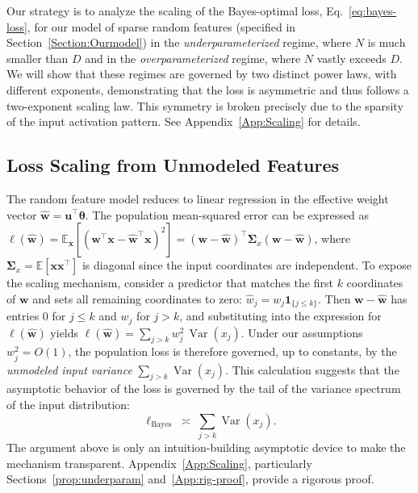\documentclass[11pt]{article}
\theoremstyle{plain}
\theoremstyle{definition}
\theoremstyle{remark}
\newcommand{\JSCheck}[1]{#1}
\begin{document}
Our strategy is to analyze the scaling of the Bayes-optimal loss,  Eq.~\eqref{eq:bayes-loss}, for our model of sparse random features (specified in Section~\ref{Section:Ourmodel}) in the
\emph{underparameterized} regime, where $N$
is much smaller than $D$ and in
the \emph{overparameterized} regime, where \(N\) vastly exceeds \(D\). We will show
that these regimes are governed by two distinct power laws, with different
exponents, demonstrating that the loss is asymmetric and thus follows a two-exponent scaling law. This symmetry is broken precisely due to the sparsity of the input activation pattern.  See Appendix~\ref{App:Scaling} for details. 

\subsection{Loss Scaling from Unmodeled Features}


The random feature model reduces to linear regression in the effective weight vector \(\hat{\mathbf{w}} = \mathbf{u}^\top \boldsymbol{\theta}\). The population mean-squared error can be expressed as $\ell(\hat{\mathbf{w}}) = \mathbb{E}_{\mathbf{x}}\!\left[(\mathbf{w}^\top\mathbf{x} - \hat{\mathbf{w}}^\top\mathbf{x})^2\right]
= (\mathbf{w}-\hat{\mathbf{w}})^\top \boldsymbol{\Sigma}_x (\mathbf{w}-\hat{\mathbf{w}})$, where \(\boldsymbol{\Sigma}_x = \mathbb{E}[\mathbf{x}\mathbf{x}^\top]\) is diagonal
since the input coordinates are independent. \JSCheck{To expose the scaling mechanism, consider a predictor that matches the first \(k\) coordinates of \(\mathbf{w}\) and sets all remaining coordinates to zero: $\hat{w}_j = w_j \mathbf{1}_{\{j \le k\}}$}. Then \(\mathbf{w}-\hat{\mathbf{w}}\) has entries \(0\) for \(j \le k\) and \(w_j\)
for \(j>k\), and substituting into the expression for \(\ell(\hat{\mathbf{w}})\) yields
\(\ell(\hat{\mathbf{w}})
= \sum_{j>k} w_j^2\, \operatorname{Var}(x_j)\). Under our assumptions \(w_j^2 = O(1)\), the population loss is therefore governed, up to constants, by the \emph{unmodeled input variance} $\sum_{j>k} \operatorname{Var}(x_j)$. \JSCheck{This calculation suggests  that the asymptotic behavior of the loss is governed by the tail of the variance spectrum of the input distribution:}
\begin{equation}
\ell_{\mathrm{Bayes}} \;\asymp\; \sum_{j>k} \operatorname{Var}(x_j).
\label{eq:bayes-tail}
\end{equation}
\JSCheck{The argument above is only an intuition-building asymptotic device to make the mechanism transparent. Appendix~\ref{App:Scaling}, particularly Sections~\ref{prop:underparam} and~\ref{App:rig-proof}, provide a rigorous proof.}
\end{document}

